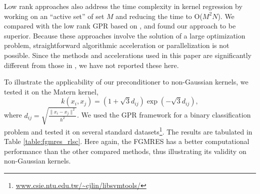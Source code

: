 \documentclass[10pt,journal,letterpaper,compsoc]{IEEEtran}
\begin{document}
Low rank approaches \cite{SnelsonGhahramani,Seeger2003,SPGP} also address the time complexity in kernel regression by working on an ``active set'' of set $M$ and reducing the time to O($M^2N$). We compared with the low rank GPR based on \cite{SPGP}, and found our approach to be superior. Because these approaches involve the solution of a large optimization problem, straightforward algorithmic acceleration or parallelization is not possible. Since the methods and accelerations used in this paper are significantly different from those in \cite{SPGP}, we have not reported these here.

To illustrate the applicability of our preconditioner to non-Gaussian kernels, we tested it on the Matern kernel\cite{GPR_Rasmussen},
\begin{equation}k(x_i,x_j)=(1 + \sqrt{3}d_{ij}) \exp(-\sqrt{3}d_{ij}),\label{eq:MaternKernel}\end{equation}
where $d_{ij}=\sqrt{\frac{\|x_i-x_j\|^2}{h^2}}$. We used the GPR framework for a binary classification problem and tested it on several standard datasets\footnote{\url{www.csie.ntu.edu.tw/~cjlin/libsvmtools/}}. The results are tabulated in Table \ref{table:fgmres_rlsc}. Here again, the FGMRES has a better computational performance than the other compared methods, thus illustrating its validity on non-Gaussian kernels.
\end{document}
